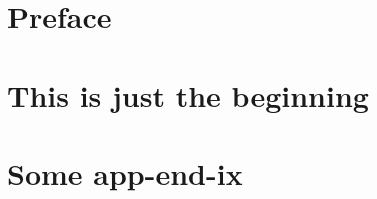 \documentclass[12pt]{report}
\begin{document}
   
   
   \chapter*{Preface}
   

   \tableofcontents

   \chapter{This is just the beginning}
   

   \appendix
   \chapter{Some app-end-ix}
   
\end{document}

